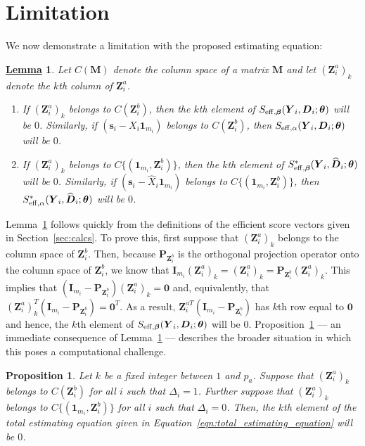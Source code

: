 \documentclass[12pt]{article}
\def\bzero{{\mathbf 0}}
\def\bbeta{{\boldsymbol{\beta}}}
\def\btheta{{\boldsymbol{\theta}}}
\def\bzero{{\boldsymbol{0}}}
\def\bone{{\boldsymbol{1}}}
\def\bs{{\boldsymbol s}}
\def\bD{{\boldsymbol D}}
\def\bI{{\boldsymbol I}}
\def\bM{{\boldsymbol M}}
\def\bP{{\boldsymbol P}}
\def\bY{{\boldsymbol Y}}
\def\bZ{{\boldsymbol Z}}
\def\tilD{\bD}
\newtheorem{proposition}{Proposition}
\newtheorem{Lem}{\underline{\bf Lemma}}
\begin{document}
\section{Limitation}
\label{sec:limitation}
We now demonstrate a limitation with the proposed estimating equation:
\begin{Lem}
\label{lem:limitation}
Let $C(\bM)$ denote the column space of a matrix $\bM$ and let $(\bZ^a_i)_k$ denote the $k$th column of $\bZ^a_i$. 
\begin{enumerate}
    \item[A] If $(\bZ^a_i)_k$ belongs to $C(\bZ^b_i)$, then the $k$th element of $S_{\rm{eff},\bbeta}(\bY_i,\tilD_i;\btheta)$ will be $0$. Similarly, if $(\bs_i-X_i\bone_{m_i})$ belongs to $C(\bZ^b_i)$, then $S_{\rm{eff},\alpha}(\bY_i,\tilD_i;\btheta)$ will be $0$.
    \item[B] If $(\bZ^a_i)_k$ belongs to $C\{(\bone_{m_i},\bZ_i^b)\}$, then the $k$th element of $S_{\rm{eff},\bbeta}^*(\bY_i,\widehat{\tilD}_i;\btheta)$ will be $0$. Similarly, if $(\bs_i-\widehat{X}_i\bone_{m_i})$ belongs to $C\{(\bone_{m_i},\bZ_i^b)\}$, then $S_{\rm{eff},\alpha}^*(\bY_i,\widehat{\tilD}_i;\btheta)$ will be $0$.
\end{enumerate}
\end{Lem}

Lemma~\ref{lem:limitation} follows quickly from the definitions of the efficient score vectors given in Section~\ref{sec:calcs}. To prove this, first suppose that $(\bZ^a_i)_k$ belongs to the column space of $\bZ_i^b$. Then, because $\bP_{\bZ_i^b}$ is the orthogonal projection operator onto the column space of $\bZ_i^b$, we know that $\bI_{m_i}(\bZ^a_i)_k=(\bZ^a_i)_k =\bP_{\bZ^b_i}(\bZ^a_i)_k$. This implies that $(\bI_{m_i} - \bP_{\bZ^b_i})(\bZ^a_i)_k = \bzero$ and, equivalently, that $(\bZ^a_i)_k^T(\bI_{m_i} - \bP_{\bZ^b_i}) = \bzero^T$. As a result, $\bZ^{aT}_i(\bI_{m_i} - \bP_{\bZ^b_i})$ has $k$th row equal to $\bzero$ and hence, the $k$th element of $S_{\rm{eff},\bbeta}(\bY_i,\tilD_i;\btheta)$ will be 0. Proposition~\ref{prop:limitation} --- an immediate consequence of Lemma~\ref{lem:limitation} --- describes the broader situation in which this poses a computational challenge.

\begin{proposition}
\label{prop:limitation}
Let $k$ be a fixed integer between $1$ and $p_a$. Suppose that $(\bZ^a_i)_k$ belongs to $C(\bZ^b_i)$ for all $i$ such that $\Delta_i=1$. Further suppose that $(\bZ^a_i)_k$ belongs to $C\{(\bone_{m_i},\bZ_i^b)\}$ for all $i$ such that $\Delta_i=0$. Then, the $k$th element of the total estimating equation given in Equation~\eqref{eqn:total_estimating_equation} will be $0$.
\end{proposition}
\end{document}
